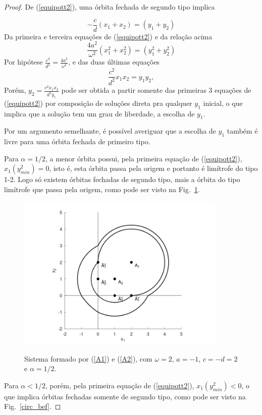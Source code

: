 \begin{proof}
De (\ref{equipott2}), uma órbita fechada de segundo tipo implica

$$
-\frac{c}{d}(x_1+x_2)=(y_1+y_2)
$$
Da primeira e terceira equações de (\ref{equipott2}) e da relação acima
$$\frac{4a^2}{\omega^2} (x_1^2+x_2^2) = (y_1^2+y_2^2)
$$
Por hipótese $\frac{c^2}{d^2}=\frac{4a^2}{\omega^2}$, e das duas últimas equações
$$
\frac{c^2}{d^2}x_1x_2=y_1y_2,
$$
Porém, $y_2=\frac{c^2x_1x_2}{d^2y_1}$ pode ser obtida a partir somente das primeiras 3 equações de (\ref{equipott2}) por composição de soluções direta pra qualquer $y_1$ inicial, o que implica que a solução tem um grau de liberdade, a escolha de $y_1$.

Por um argumento semelhante, é possível averiguar que a escolha de $y_1$ também é livre para uma órbita fechada de primeiro tipo.

Para $\alpha=1/2$, a menor órbita possui, pela primeira equação de (\ref{equipott2}), $x_1(y_{min}^2)=0$, isto é, esta órbita passa pela origem e portanto é limítrofe do tipo 1-2. Logo só existem órbitas fechadas de segundo tipo, mais a órbita do tipo limítrofe que passa pela origem, como pode ser visto na Fig.~\ref{circ_mid}.

\begin{figure}[H]
\centering
\includegraphics[width=10cm]{circ_mid}\\
\caption{\label{circ_mid}Sistema formado por (\ref{A1}) e (\ref{A2}), com $\omega=2$, $a=-1$, $c=-d=2$ e $\alpha=1/2$.}
\end{figure}

Para $\alpha<1/2$, porém, pela primeira equação de (\ref{equipott2}), $x_1(y_{min}^2)<0$, o que implica órbitas fechadas somente de segundo tipo, como pode ser visto na Fig.~\ref{circ_bef}.


\end{proof}
